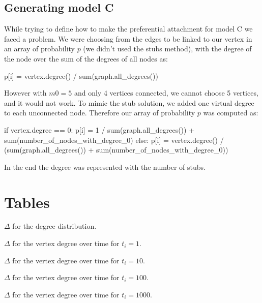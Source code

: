 \documentclass[a4paper]{article}
\begin{document}
\subsection{Generating model C}

While trying to define how to make the preferential attachment for model C we
faced a problem. We were choosing from the edges to be linked to our vertex in
an array of probability $p$ (we didn't used the stubs method), with the degree
of the node over the sum of the degrees of all nodes as:
%
\begin{pycode}
p[i] = vertex.degree() / sum(graph.all_degrees())
\end{pycode}
%
However with $m0 = 5$ and only 4 vertices  connected, we cannot choose 5
vertices, and it would not work. To mimic the stub solution, we added one
virtual degree to each unconnected node. Therefore our array of probability $p$
was computed as:

\begin{pycode}
if vertex.degree == 0:
	p[i] = 1 / sum(graph.all_degrees()) + sum(number_of_nodes_with_degree_0)
else:
	p[i] = vertex.degree() / (sum(graph.all_degrees()) +
		sum(number_of_nodes_with_degree_0))
\end{pycode}

In the end the degree was represented with the number of stubs.

\appendix
\section{Tables}


\begin{table}[H]
	\centering
	
	\caption{$\Delta$ for the degree distribution.}
	\label{tab:AICdd}
\end{table}
\begin{table}[H]
	\centering
	
	\caption{$\Delta$ for the vertex degree over time for $t_i = 1$.}
	\label{tab:AICdt1}
\end{table}
\begin{table}[H]
	\centering
	
	\caption{$\Delta$ for the vertex degree over time for $t_i = 10$.}
	\label{tab:AICdt10}
\end{table}
\begin{table}[H]
	\centering
	
	\caption{$\Delta$ for the vertex degree over time for $t_i = 100$.}
	\label{tab:AICdt100}
\end{table}
\begin{table}[H]
	\centering
	
	\caption{$\Delta$ for the vertex degree over time for $t_i = 1000$.}
	\label{tab:AICdt1000}
\end{table}
\end{document}
